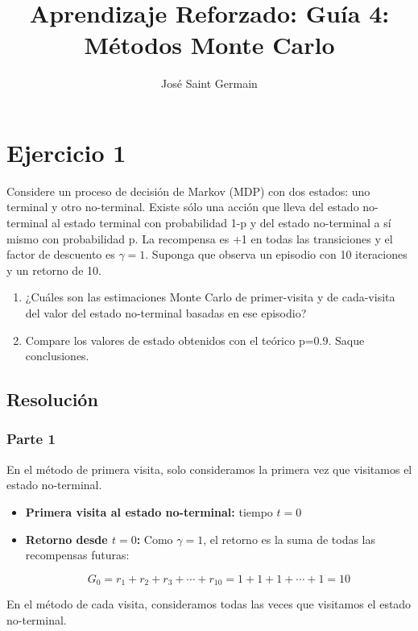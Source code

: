 \documentclass[12pt,a4paper]{article}
\title{Aprendizaje Reforzado: Guía 4: Métodos Monte Carlo}
\author{José Saint Germain}
\begin{document}
\maketitle

\section{Ejercicio 1} %

Considere un proceso de decisión de Markov (MDP) con dos estados: uno terminal y otro no-terminal.
Existe sólo una acción que lleva del estado no-terminal al estado terminal con probabilidad 1-p y 
del estado no-terminal a sí mismo con probabilidad p. La recompensa es +1 en todas las
transiciones y el factor de descuento es $\gamma = 1$. Suponga que observa un episodio con
10 iteraciones y un retorno de 10.

\begin{enumerate}
    \item ¿Cuáles son las estimaciones Monte Carlo de primer-visita y de cada-visita
    del valor del estado no-terminal basadas en ese episodio?
    \item Compare los valores de estado obtenidos con el teórico p=0.9. Saque conclusiones.
\end{enumerate}

\subsection{Resolución}

\subsubsection{Parte 1} %

En el método de primera visita, solo consideramos la primera vez que visitamos el estado no-terminal.

\begin{itemize}
    \item \textbf{Primera visita al estado no-terminal:} tiempo $t=0$
    \item \textbf{Retorno desde $t=0$:} Como $\gamma = 1$, el retorno es la suma de todas las recompensas futuras:
    
    $$G_0 = r_1 + r_2 + r_3 + \cdots + r_{10} = 1 + 1 + 1 + \cdots + 1 = 10$$
\end{itemize}

En el método de cada visita, consideramos todas las veces que visitamos el estado no-terminal.
\end{document}
